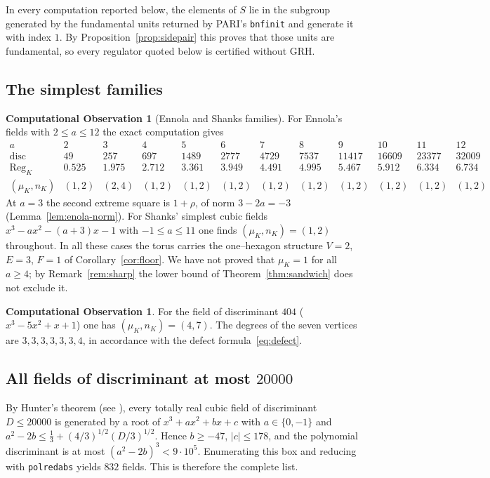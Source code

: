 \documentclass[11pt,reqno]{amsart}
\theoremstyle{plain}
\theoremstyle{definition}
\newtheorem{observation}[theorem]{Computational Observation}
\newcommand{\Reg}{\operatorname{Reg}}
\newcommand{\disc}{\operatorname{disc}}
\newcommand{\nK}{n_K}
\newcommand{\muK}{\mu_K}
\begin{document}
In every computation reported below, the elements of $S$ lie in the subgroup generated by the fundamental
units returned by PARI's \texttt{bnfinit} and generate it with index $1$. By
Proposition~\ref{prop:sidepair} this proves that those units are fundamental, so every regulator quoted
below is certified without GRH.

\subsection{The simplest families}

\begin{observation}[Ennola and Shanks families]\label{obs:ennola}
For Ennola's fields with $2\le a\le 12$ the exact computation gives
\[
\renewcommand{\arraystretch}{1.15}
\begin{array}{c|ccccccccccc}
a & 2 & 3 & 4 & 5 & 6 & 7 & 8 & 9 & 10 & 11 & 12\\\hline
\disc & 49 & 257 & 697 & 1489 & 2777 & 4729 & 7537 & 11417 & 16609 & 23377 & 32009\\
\Reg_K & 0.525 & 1.975 & 2.712 & 3.361 & 3.949 & 4.491 & 4.995 & 5.467 & 5.912 & 6.334 & 6.734\\
(\muK,\nK) & (1,2) & (2,4) & (1,2) & (1,2) & (1,2) & (1,2) & (1,2) & (1,2) & (1,2) & (1,2) & (1,2)
\end{array}
\]
At $a=3$ the second extreme square is $1+\rho$, of norm $3-2a=-3$ (Lemma~\ref{lem:enola-norm}). For Shanks'
simplest cubic fields $x^3-ax^2-(a+3)x-1$ with $-1\le a\le 11$ one finds $(\muK,\nK)=(1,2)$ throughout. In all
these cases the torus carries the one--hexagon structure $V=2$, $E=3$, $F=1$ of Corollary~\ref{cor:floor}.
We have not proved that $\muK=1$ for all $a\ge4$; by Remark~\ref{rem:sharp} the lower bound of
Theorem~\ref{thm:sandwich} does not exclude it.
\end{observation}

\begin{observation}\label{obs:404}
For the field of discriminant $404$ \textup{(}$x^3-5x^2+x+1$\textup{)} one has $(\muK,\nK)=(4,7)$. The degrees
of the seven vertices are $3,3,3,3,3,3,4$, in accordance with the defect formula~\eqref{eq:defect}.
\end{observation}

\subsection{All fields of discriminant at most $20000$}
By Hunter's theorem (see \cite{Cohen}), every totally real cubic field of discriminant $D\le20000$ is
generated by a root of $x^3+ax^2+bx+c$ with $a\in\{0,-1\}$ and $a^2-2b\le\tfrac13+(4/3)^{1/2}(D/3)^{1/2}$.
Hence $b\ge-47$, $|c|\le178$, and the polynomial discriminant is at most $(a^2-2b)^3<9\cdot10^5$. Enumerating
this box and reducing with \texttt{polredabs} yields $832$ fields. This is therefore the complete list.
\end{document}
